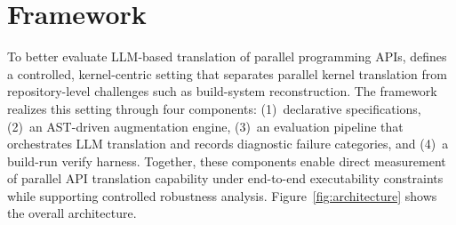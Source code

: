 %
%

\section{\parbench{} Framework}
\label{sec:framework}

To better evaluate LLM-based translation of parallel programming APIs, \parbench{} defines a controlled, kernel-centric setting that separates parallel kernel translation from repository-level challenges such as build-system reconstruction. The framework realizes this setting through four components: (1)~declarative specifications, (2)~an AST-driven augmentation engine, (3)~an evaluation pipeline that orchestrates LLM translation and records diagnostic failure categories, and (4)~a build-run verify harness. Together, these components enable direct measurement of parallel API translation capability under end-to-end executability constraints while supporting controlled robustness analysis. Figure~\ref{fig:architecture} shows the overall architecture.

